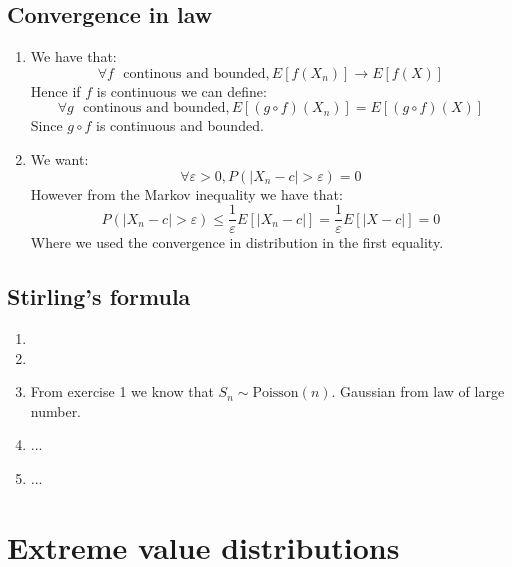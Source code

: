 \documentclass[10pt,a4paper]{book}
\begin{document}
\section{Convergence in law}

\begin{enumerate}

\item We have that:
\[
\forall f \mbox{~~continous and bounded}, E[f(X_n)] \to E[f(X)] 
\]
Hence if $f$ is continuous we can define:
\[
\forall g \mbox{~~continous and bounded}, E[(g \circ f)(X_n)] = E[(g\circ f)(X)]
\]
Since $g \circ f$ is continuous and bounded.

\item We want:
\[
\forall \varepsilon > 0, P(|X_n - c| > \varepsilon) = 0
\]
However from the Markov inequality we have that:
\[
P(|X_n - c| > \varepsilon) \leq \frac{1}{\varepsilon}E[|X_n - c|] = \frac{1}{\varepsilon}E[|X - c|] = 0
\]
Where we used the convergence in distribution in the first equality.

\end{enumerate}

\section{Stirling's formula}
\begin{enumerate}

\item 

\item 

\item From exercise 1 we know that $S_n \sim \mbox{Poisson}(n)$. Gaussian from law of large number.

\item ...

\item ... 

\end{enumerate}




\chapter{Extreme value distributions}
\end{document}
